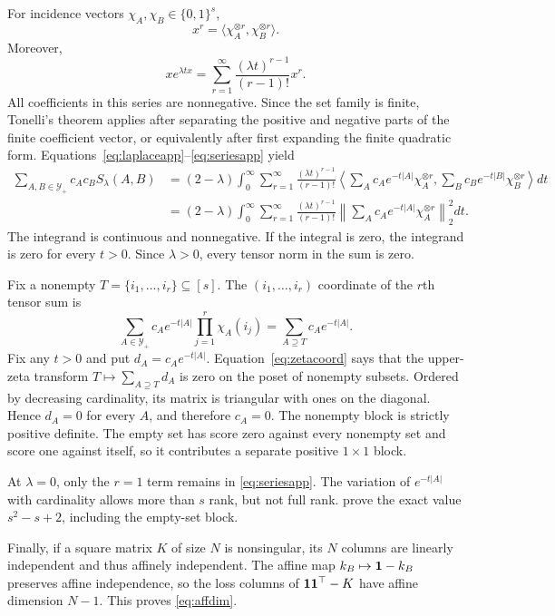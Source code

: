 For incidence vectors $\chi_A,\chi_B\in\{0,1\}^s$,
\[
 x^r=\langle\chi_A^{\otimes r},\chi_B^{\otimes r}\rangle.
 \tag{31}\label{eq:tensoridentity}
\]
Moreover,
\[
 xe^{\lambda tx}
 =\sum_{r=1}^\infty
 \frac{(\lambda t)^{r-1}}{(r-1)!}x^r.
 \tag{32}\label{eq:seriesapp}
\]
All coefficients in this series are nonnegative. Since the set family is
finite, Tonelli's theorem applies after separating the positive and negative
parts of the finite coefficient vector, or equivalently after first expanding
the finite quadratic form. Equations~\eqref{eq:laplaceapp}--\eqref{eq:seriesapp}
yield
\begin{align}
 \sum_{A,B\in\mathcal Y_+}c_Ac_BS_\lambda(A,B)
 &=(2-\lambda)\int_0^\infty
 \sum_{r=1}^\infty\frac{(\lambda t)^{r-1}}{(r-1)!}
 \left\langle
 \sum_Ac_Ae^{-t|A|}\chi_A^{\otimes r},
 \sum_Bc_Be^{-t|B|}\chi_B^{\otimes r}
 \right\rangle dt\\
 &=(2-\lambda)\int_0^\infty
 \sum_{r=1}^\infty\frac{(\lambda t)^{r-1}}{(r-1)!}
 \left\|\sum_Ac_Ae^{-t|A|}\chi_A^{\otimes r}\right\|_2^2dt.
 \tag{33}\label{eq:quadraticapp}
\end{align}
The integrand is continuous and nonnegative. If the integral is zero, the
integrand is zero for every $t>0$. Since $\lambda>0$, every tensor norm in
the sum is zero.

Fix a nonempty $T=\{i_1,\ldots,i_r\}\subseteq[s]$. The
$(i_1,\ldots,i_r)$ coordinate of the $r$th tensor sum is
\[
 \sum_{A\in\mathcal Y_+}c_Ae^{-t|A|}
 \prod_{j=1}^r\chi_A(i_j)
 =\sum_{A\supseteq T}c_Ae^{-t|A|}.
 \tag{34}\label{eq:zetacoord}
\]
Fix any $t>0$ and put $d_A=c_Ae^{-t|A|}$. Equation~\eqref{eq:zetacoord}
says that the upper-zeta transform $T\mapsto\sum_{A\supseteq T}d_A$ is zero
on the poset of nonempty subsets. Ordered by decreasing cardinality, its
matrix is triangular with ones on the diagonal. Hence $d_A=0$ for every
$A$, and therefore $c_A=0$. The nonempty block is strictly positive
definite. The empty set has score zero against every nonempty set and score
one against itself, so it contributes a separate positive $1\times1$ block.

At $\lambda=0$, only the $r=1$ term remains in
\eqref{eq:seriesapp}. The variation of $e^{-t|A|}$ with cardinality allows
more than $s$ rank, but not full rank. \citet{zhang2026exact} prove the exact
value $s^2-s+2$, including the empty-set block.

Finally, if a square matrix $K$ of size $N$ is nonsingular, its $N$ columns
are linearly independent and thus affinely independent. The affine map
$k_B\mapsto\mathbf 1-k_B$ preserves affine independence, so the loss columns of
$\mathbf 1\mathbf 1^\top-K$ have affine dimension $N-1$. This proves
\eqref{eq:affdim}.

